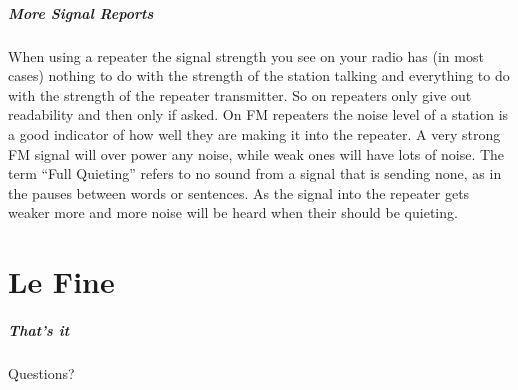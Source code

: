 \documentclass[10pt, handout]{beamer}
\begin{document}
\begin{frame}
\frametitle{More Signal Reports}
When using a repeater the signal strength you see on your radio has (in most cases) nothing to do with the strength of the station talking and everything to do with the strength of the repeater transmitter. So on repeaters only give out readability and then only if asked. On FM repeaters the noise level of a station is a good indicator of how well they are making it into the repeater. A very strong FM signal will over power any noise, while weak ones will have lots of noise. The term ``Full Quieting'' refers to no sound from a signal that is sending none, as in the pauses between words or sentences. As the signal into the repeater gets weaker more and more noise will be heard when their should be quieting.
\end{frame}

\part{Le Fine}


\begin{frame}
\frametitle{That's it}
Questions?
\end{frame}

%
%
\end{document}
